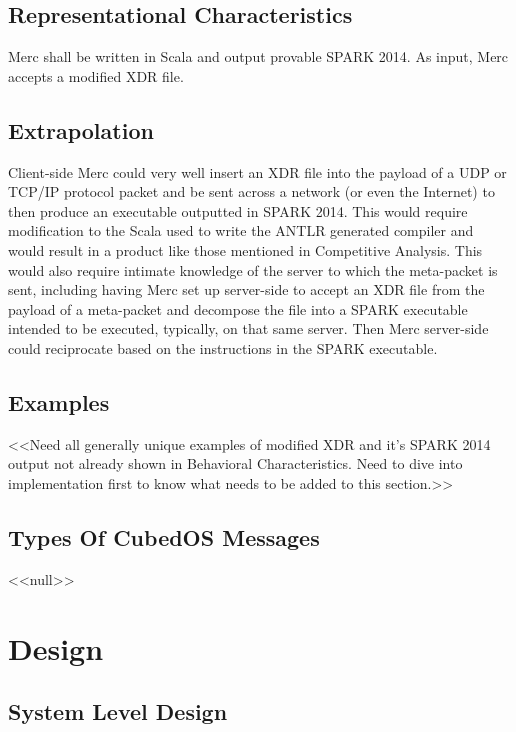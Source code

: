 \subsection{Representational Characteristics}

Merc shall be written in Scala and output provable SPARK 2014. As input, Merc accepts a
modified XDR file.

\subsection{Extrapolation}

Client-side Merc could very well insert an XDR file into the payload of a UDP or TCP/IP
protocol packet and be sent across a network (or even the Internet) to then produce an
executable outputted in SPARK 2014. This would require modification to the Scala used to write
the ANTLR generated compiler and would result in a product like those mentioned in Competitive
Analysis. This would also require intimate knowledge of the server to which the meta-packet is
sent, including having Merc set up server-side to accept an XDR file from the payload of a
meta-packet and decompose the file into a SPARK executable intended to be executed, typically,
on that same server. Then Merc server-side could reciprocate based on the instructions in the
SPARK executable.

\subsection{Examples}

<<Need all generally unique examples of modified XDR and it’s SPARK 2014 output not already
shown in Behavioral Characteristics. Need to dive into implementation first to know what needs
to be added to this section.>>

\subsection{Types Of CubedOS Messages}

<<null>>
	
\section{Design}

\subsection{System Level Design}

